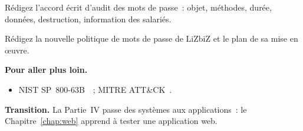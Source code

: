 \begin{boxexo}[title={\ding{45}\quad Exercice~13.9. L'accord \niveauexpert}]
Rédigez l'accord écrit d'audit des mots de passe~: objet, méthodes, durée,
données, destruction, information des salariés.
\end{boxexo}

\begin{boxexo}[title={\ding{45}\quad Exercice~13.10. Politique \niveauexpert}]
Rédigez la nouvelle politique de mots de passe de LiZbiZ et le plan de sa
mise en œuvre.
\end{boxexo}

\bigskip

\begin{boxinfo}
\textbf{Pour aller plus loin.}
\begin{itemize}
    \item NIST SP~800-63B~\cite{nist80063b}~; MITRE ATT\&CK~\cite{mitreattack}.
\end{itemize}
\end{boxinfo}

\begin{boxinfo}
\textbf{Transition.} La Partie~IV passe des systèmes aux applications~: le
Chapitre~\ref{chap:web} apprend à tester une application web.
\end{boxinfo}
